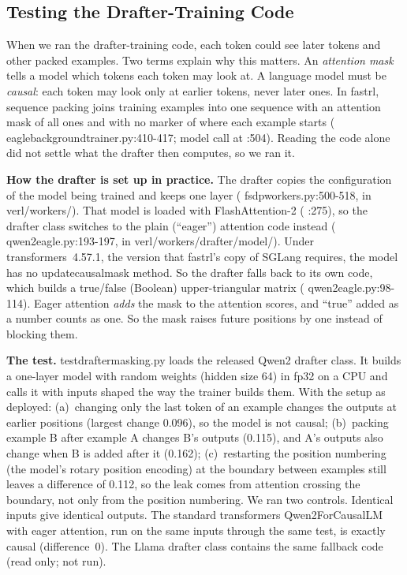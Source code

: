 \documentclass[conference]{IEEEtran}
\newcommand{\brkus}{\textunderscore\allowbreak}
\newcommand{\code}[1]{{\small\ttfamily\let\_\brkus\hyphenchar\font=-1 #1}}
\begin{document}
\subsection{Testing the Drafter-Training Code}
\label{sec:masktest}
When we ran the drafter-training code, each token could see later tokens and other packed examples. Two terms explain why this matters. An \emph{attention mask} tells a model which tokens each token may look at. A language model must be \emph{causal}: each token may look only at earlier tokens, never later ones. In fastrl, sequence packing joins training examples into one sequence with an attention mask of all ones and with no marker of where each example starts (\code{eagle\_background\_trainer.py:410-417}; model call at \code{:504}). Reading the code alone did not settle what the drafter then computes, so we ran it.

\textbf{How the drafter is set up in practice.} The drafter copies the configuration of the model being trained and keeps one layer (\code{fsdp\_workers.py:500-518}, in \code{verl/workers/}). That model is loaded with FlashAttention-2 (\code{:275}), so the drafter class switches to the plain (``eager'') attention code instead (\code{qwen2\_eagle.py:193-197}, in \code{verl/workers/drafter/model/}). Under \code{transformers}~4.57.1, the version that fastrl's copy of SGLang requires, the model has no \code{\_update\_causal\_mask} method. So the drafter falls back to its own code, which builds a true/false (Boolean) upper-triangular matrix (\code{qwen2\_eagle.py:98-114}). Eager attention \emph{adds} the mask to the attention scores, and ``true'' added as a number counts as one. So the mask raises future positions by one instead of blocking them.

\textbf{The test.} \code{test\_drafter\_masking.py} loads the released Qwen2 drafter class. It builds a one-layer model with random weights (hidden size 64) in fp32 on a CPU and calls it with inputs shaped the way the trainer builds them. With the setup as deployed: (a)~changing only the last token of an example changes the outputs at earlier positions (largest change 0.096), so the model is not causal; (b)~packing example B after example A changes B's outputs (0.115), and A's outputs also change when B is added after it (0.162); (c)~restarting the position numbering (the model's rotary position encoding) at the boundary between examples still leaves a difference of 0.112, so the leak comes from attention crossing the boundary, not only from the position numbering. We ran two controls. Identical inputs give identical outputs. The standard \code{transformers} \code{Qwen2ForCausalLM} with eager attention, run on the same inputs through the same test, is exactly causal (difference~0). The Llama drafter class contains the same fallback code (read only; not run).
\end{document}
